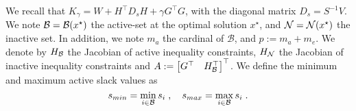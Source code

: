 We recall that $K_\gamma = W + H^\top D_s H + \gamma G^\top G$, with
the diagonal matrix $D_s = S^{-1} V$.
We note $\mathcal{B} = \mathcal{B}(x^\star)$ the active-set at the optimal solution $x^\star$,
and $\mathcal{N} = \mathcal{N}(x^\star)$ the inactive set.
In addition, we note $m_a$ the cardinal of $\mathcal{B}$,
and $p := m_a + m_e$. We denote by
$H_{\mathcal{B}}$ the Jacobian of active inequality constraints, $H_{\mathcal{N}}$ the
Jacobian of inactive inequality constraints and
$A := \begin{bmatrix} G^\top & H_{\mathcal{B}}^\top \end{bmatrix}^\top$.
We define the minimum and maximum active slack values as
\begin{equation}
  s_{min} = \min_{i \in \mathcal{B}} s_i \; , \quad
  s_{max} = \max_{i \in \mathcal{B}} s_i \; .
\end{equation}

